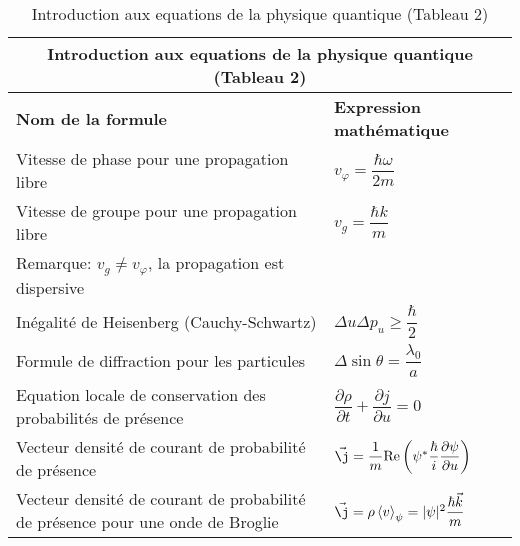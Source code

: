 \documentclass[10pt,a4paper,titlepage,portrait]{article}
\newcommand*{\dpv}[2]
{
    \dfrac{\partial#1}{\partial#2}
}
\renewcommand{\arraystretch}{2}
\newcommand{\av}[2]
{
    \left\langle#1\right\rangle_{#2}
}
\begin{document}
\newpage 
\begin{table}[H]
    \centering
    \renewcommand{\arraystretch}{1.5} %
    \setlength{\tabcolsep}{8pt} %
    \begin{tabular}{@{}p{9cm}p{10cm}@{}}
        \toprule
        \multicolumn{2}{c}{\textbf{Introduction aux equations de la physique quantique (Tableau 2)}} \\
        \midrule
        \textbf{Nom de la formule} & \textbf{Expression mathématique} \\
        \midrule

    Vitesse de phase pour une propagation libre & $v_{\varphi} = \dfrac{\hbar \omega}{2m}$ \\
    Vitesse de groupe pour une propagation libre & $v_g = \dfrac{\hbar k}{m}$ \\
    Remarque: $v_g \neq v_\varphi$, la propagation est dispersive & \\ 
    Inégalité de Heisenberg (Cauchy-Schwartz) & $\Delta u \Delta p_u \geqslant \dfrac{\hbar}{2}$ \\
    Formule de diffraction pour les particules & $\Delta \sin\theta = \dfrac{\lambda_0}{a}$ \\
    Equation locale de conservation des probabilités de présence & $\dpv{\rho}{t} + \dpv{j}{u} = 0 $ \\
    Vecteur densité de courant de probabilité de présence & $\vec {\j} = \dfrac{1}{m}\mathrm{Re}\left(\psi^*\dfrac{\hbar}{i} \dpv{\psi}{u} \right)$ \\
    Vecteur densité de courant de probabilité de présence pour une onde de Broglie & $\vec {\j} = \rho \av{v}{\psi} = |\psi|^2 \dfrac{\hbar \vec k}{m}$ \\

\bottomrule
\end{tabular}
\caption{Introduction aux equations de la physique quantique (Tableau 2)}
\label{tab:quantphis}
\end{table}
\end{document}
